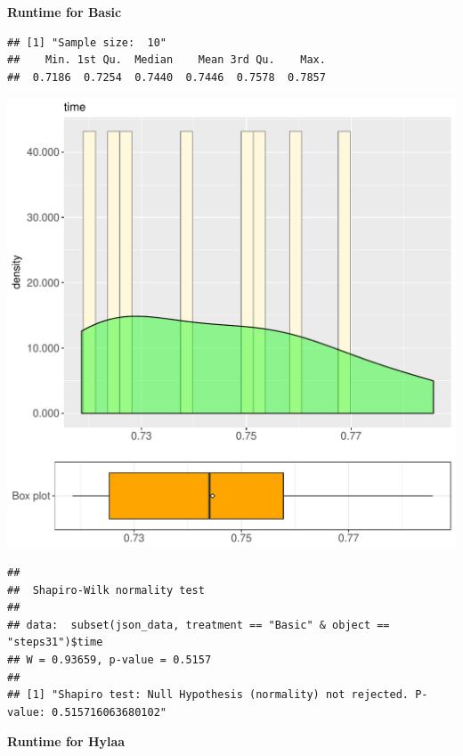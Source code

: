 \documentclass{article}\usepackage[]{graphicx}\usepackage[]{color}
\makeatletter
\def\maxwidth{ %
  \ifdim\Gin@nat@width>\linewidth
    \linewidth
  \else
    \Gin@nat@width
  \fi
}
\newenvironment{kframe}{%
 \def\at@end@of@kframe{}%
 \ifinner\ifhmode%
  \def\at@end@of@kframe{\end{minipage}}%
  \begin{minipage}{\columnwidth}%
 \fi\fi%
 \def\FrameCommand##1{\hskip\@totalleftmargin \hskip-\fboxsep
 \colorbox{shadecolor}{##1}\hskip-\fboxsep
     \hskip-\linewidth \hskip-\@totalleftmargin \hskip\columnwidth}%
 \MakeFramed {\advance\hsize-\width
   \@totalleftmargin\z@ \linewidth\hsize
   \@setminipage}}%
 {\par\unskip\endMakeFramed%
 \at@end@of@kframe}
\newenvironment{knitrout}{}{} %
\makeatother
\begin{document}
 \textbf{Runtime for Basic}
\begin{knitrout}
\color{fgcolor}\begin{kframe}
\begin{verbatim}
## [1] "Sample size:  10"
##    Min. 1st Qu.  Median    Mean 3rd Qu.    Max. 
##  0.7186  0.7254  0.7440  0.7446  0.7578  0.7857
\end{verbatim}
\end{kframe}
\includegraphics[width=\maxwidth]{figure/RH3_Basic_steps31-1} 
\begin{kframe}\begin{verbatim}
## 
## 	Shapiro-Wilk normality test
## 
## data:  subset(json_data, treatment == "Basic" & object == "steps31")$time
## W = 0.93659, p-value = 0.5157
## 
## [1] "Shapiro test: Null Hypothesis (normality) not rejected. P-value: 0.515716063680102"
\end{verbatim}
\end{kframe}
\end{knitrout}
 \textbf{Runtime for Hylaa}
\end{document}
